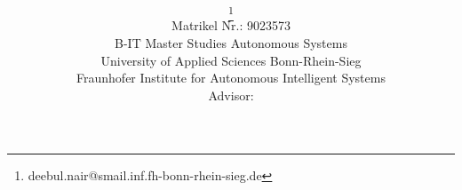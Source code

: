 \title{\PaperTitle\\\PaperSubject}
\author{\href{\PaperMainWriterEMail}{\PaperMainWriter \footnote{\href{\PaperMainWriterEMail} {deebul.nair@smail.inf.fh-bonn-rhein-sieg.de}} 
}\\%
Matrikel Nr.: 9023573 \vspace{0.5cm} \\ 
B-IT Master Studies Autonomous Systems \vspace{0.5cm} \\ 
University of Applied Sciences Bonn-Rhein-Sieg\\ %
Fraunhofer Institute for Autonomous Intelligent Systems \vspace{0.7cm} \\ \setcounter{footnote}{6}
Advisor: \PaperLecturer  
}%
\maketitle
